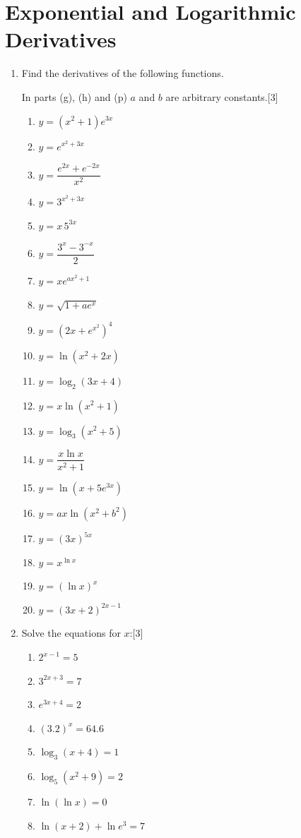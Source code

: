 \newpage

\section*{Exponential and Logarithmic Derivatives}
\begin{enumerate}
\item Find the derivatives of the following functions. 
\begin{multicolblock}{In parts (g), (h) and (p) $a$ and $b$ are arbitrary constants.}[3]
  \begin{enumerate}
    \item $y=\left(x^{2}+1\right)e^{3x}$
    \item $y=e^{x^{2}+3x}$
    \item $y=\dfrac{e^{2x}+e^{-2x}}{x^{2}}$
    \item $y=3^{x^{2}+3x}$
    \item $y=x\,5^{3x}$
    \item $y=\dfrac{3^{x}-3^{-x}}{2}$
    \item $y=x e^{a x^{2}+1}$
    \item $y=\sqrt{1+a e^{x}}$
    \item $y=\left(2x+e^{x^{2}}\right)^{4}$
    \item $y=\ln\left(x^{2}+2x\right)$
    \item $y=\log_{2}(3x+4)$
    \item $y=x\ln\left(x^{2}+1\right)$
    \item $y=\log_{3}\left(x^{2}+5\right)$
    \item $y=\dfrac{x\ln x}{x^{2}+1}$
    \item $y=\ln\left(x+5e^{3x}\right)$
    \item $y=a x\ln\left(x^{2}+b^{2}\right)$
    \item $y=(3x)^{5x}$
    \item $y=x^{\ln x}$
    \item $y=(\ln x)^{x}$
    \item $y=(3x+2)^{2x-1}$
  \end{enumerate}
\end{multicolblock}

\item 
\begin{multicolblock}{Solve the equations for $x$:}[3]
  \begin{enumerate}
    \item $2^{x-1}=5$
    \item $3^{2x+3}=7$
    \item $e^{3x+4}=2$
    \item $(3.2)^{x}=64.6$
    \item $\log_{3}(x+4)=1$
    \item $\log_{5}\!\left(x^{2}+9\right)=2$
    \item $\ln(\ln x)=0$
    \item $\ln(x+2)+\ln e^{3}=7$
  \end{enumerate}
\end{multicolblock}


\end{enumerate}
